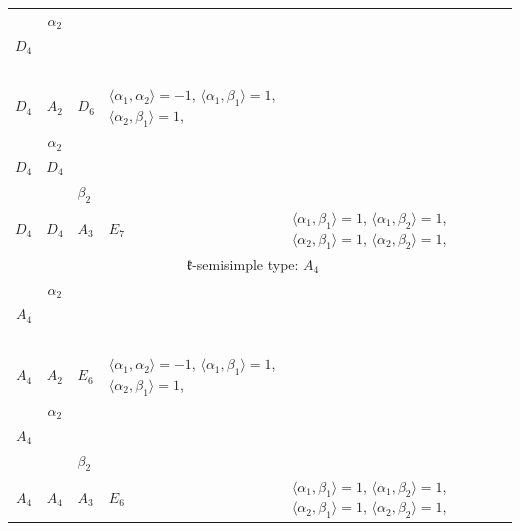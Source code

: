 \documentclass[12pt]{report}
\begin{document}
\begin{appendix}
{\begin{longtable}{rcl p{1cm}p{1cm}p{3cm} }
\\
\begin{tabular}{cc}$\alpha_1$+ & $\alpha_2$\\\tiny{ $D_4$ } & \tiny{  }\end{tabular} &\begin{tabular}{c} = \\~ \end{tabular} & \begin{tabular}{c}$\beta_1$\\\tiny{ $D_4$ }\end{tabular} & $A_2$ & $D_6$ & $\langle\alpha_1, \alpha_2\rangle=-1$,  $\langle\alpha_1, \beta_1\rangle=1$, $\langle\alpha_2, \beta_1\rangle=1$, 
\\
\begin{tabular}{cc}$\alpha_1$+ & $\alpha_2$\\\tiny{ $D_4$ } & \tiny{ $D_4$ }\end{tabular} &\begin{tabular}{c} = \\~ \end{tabular} & \begin{tabular}{cc}$\beta_1$+ & $\beta_2$\\\tiny{ $D_4$ } & \tiny{ $D_4$ }\end{tabular} & $A_3$ & $E_7$ &  $\langle\alpha_1, \beta_1\rangle=1$, $\langle\alpha_1, \beta_2\rangle=1$, $\langle\alpha_2, \beta_1\rangle=1$, $\langle\alpha_2, \beta_2\rangle=1$, 
\\
\hline\multicolumn{5}{c}{$\mathfrak{k}$-semisimple type: $A_4$}\\
\hline\hline\begin{tabular}{cc}$\alpha_1$+ & $\alpha_2$\\\tiny{ $A_4$ } & \tiny{  }\end{tabular} &\begin{tabular}{c} = \\~ \end{tabular} & \begin{tabular}{c}$\beta_1$\\\tiny{ $A_4$ }\end{tabular} & $A_2$ & $E_6$ & $\langle\alpha_1, \alpha_2\rangle=-1$,  $\langle\alpha_1, \beta_1\rangle=1$, $\langle\alpha_2, \beta_1\rangle=1$, 
\\
\begin{tabular}{cc}$\alpha_1$+ & $\alpha_2$\\\tiny{ $A_4$ } & \tiny{  }\end{tabular} &\begin{tabular}{c} = \\~ \end{tabular} & \begin{tabular}{cc}$\beta_1$+ & $\beta_2$\\\tiny{ $A_4$ } & \tiny{ $A_4$ }\end{tabular} & $A_3$ & $E_6$ &  $\langle\alpha_1, \beta_1\rangle=1$, $\langle\alpha_1, \beta_2\rangle=1$, $\langle\alpha_2, \beta_1\rangle=1$, $\langle\alpha_2, \beta_2\rangle=1$, 

\end{longtable}}
\end{appendix}
\end{document}
